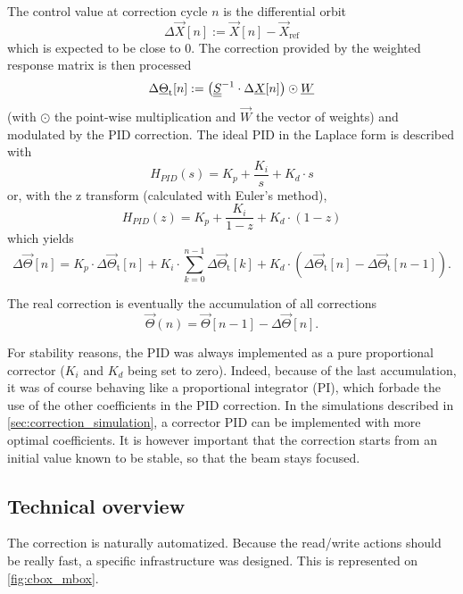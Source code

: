 The control value at correction cycle $n$ is the differential orbit
\begin{equation}
 \Delta \vec{X}[n] := \vec{X}[n]-\vec{X}_\text{ref}
\end{equation}
which is expected to be close to 0. The correction provided by the weighted response matrix is then processed
\begin{equation}
\Delta \underline{\Theta}_\text{t}[n] :=  \left(\underline{\underline{S}}^{-1} \cdot \Delta \underline{X}[n] \right) \odot \underline{W}
\end{equation}
(with $\odot$ the point-wise multiplication and $\vec{W}$ the vector of weights) and modulated by the PID correction. The ideal PID in the Laplace form is described with
\begin{equation}
H_{PID}(s) = K_p + \frac{K_i}{s} + K_d \cdot s
\end{equation}
or, with the z transform (calculated with Euler's method),
\begin{equation}
H_{PID}(z) = K_p + \frac{K_i}{1-z} + K_d \cdot (1-z)
\end{equation}
which yields
\begin{equation}
\Delta \vec{\Theta}[n] =  K_p \cdot \Delta \vec{\Theta}_\text{t}[n] + K_i \cdot \sum\limits_{k=0}^{n-1}\Delta \vec{\Theta}_\text{t}[k] + K_d \cdot \left(\Delta \vec{\Theta}_\text{t}[n] - \Delta \vec{\Theta}_\text{t}[n-1]\right).
\end{equation}

The real correction is eventually the accumulation of all corrections
\begin{equation}
\vec{\Theta}(n) = \vec{\Theta}[n-1] - \Delta \vec{\Theta}[n].
\end{equation}

For stability reasons, the PID was always implemented as a pure proportional corrector ($K_i$ and $K_d$ being set to zero). Indeed, because of the last accumulation, it was of course behaving like a proportional integrator (PI), which forbade the use of the other coefficients in the PID correction. In the simulations described in \cref{sec:correction_simulation}, a corrector PID can be implemented with more optimal coefficients. It is however important that the correction starts from an initial value known to be stable, so that the beam stays focused.

\subsection{Technical overview}
\label{sec:correction_sa_technical}
The correction is naturally automatized. Because the read/write actions should be really fast, a specific infrastructure was designed. This is represented on \cref{fig:cbox_mbox}.


